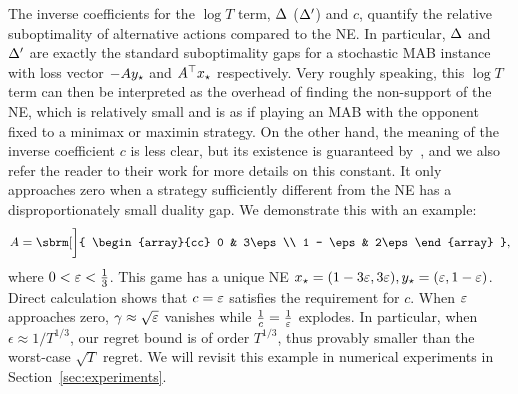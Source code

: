 {The inverse coefficients for the $\log T$ term, $\Delta$ ($\Delta'$) and $c$, quantify the relative suboptimality of alternative actions compared to the NE. 
In particular, $\Delta$ and $\Delta'$ are exactly the standard suboptimality gaps for a stochastic MAB instance with loss vector $-Ay_{\star}$ and $A^\top x_{\star}$ respectively.
Very roughly speaking, this $\log T$ term can then be interpreted as the overhead of finding the non-support of the NE, which is relatively small and is as if playing an MAB with the opponent fixed to a minimax or maximin strategy.
On the other hand, the meaning of the inverse coefficient $c$ is less clear, but its existence is guaranteed by~\citet[Theorem~5]{wei2021linear}, and we also refer the reader to their work for more details on this constant.
It only approaches zero when a strategy sufficiently different from the NE has a disproportionately small duality gap. We demonstrate this with an example:
\begin{equation}
    A=\sbrm[\bigg]{
        \begin{array}{cc}
            0 &             3\eps \\
            1 - \eps &      2\eps
        \end{array}
    },\label{eq:example-2x2-game-matrix-simplified}
\end{equation}
where $0<\varepsilon<\frac{1}{3}$. This game has a unique NE $x_{\star}=(1-3\varepsilon,3\varepsilon), y_{\star}=(\varepsilon,1-\varepsilon)$. Direct calculation shows that $c=\varepsilon$ satisfies the requirement for $c$. When $\varepsilon$ approaches zero, $\gamma\approx \sqrt{\varepsilon}$ vanishes while $\frac 1c=\frac 1{\varepsilon}$ explodes.
In particular, when $\epsilon \approx 1/T^{1/3}$, our regret bound is of order $T^{1/3}$, thus provably smaller than the worst-case $\sqrt{T}$ regret.
We will revisit this example in numerical experiments in Section~\ref{sec:experiments}.


    

    



    

}
